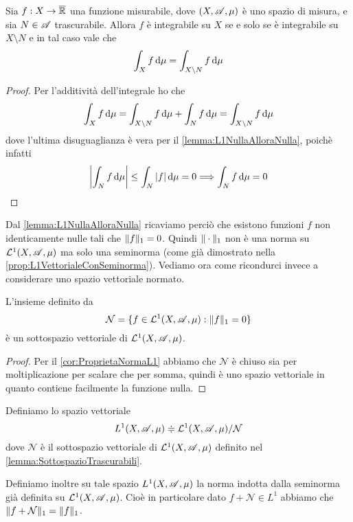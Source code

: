 \begin{corollary}\label{cor:IntegraleAMenoDiTrascurabili}
	Sia $f:X\to\overline{\mathbb R}$ una funzione misurabile, dove $(X,\mathscr A,\mu)$ è uno spazio di misura, e sia $N\in\mathscr A$ trascurabile. Allora $f$ è integrabile su $X$ se e solo se è integrabile su $X\setminus N$ e in tal caso vale che
	\begin{equation*}
		\int_X f\,\mathrm d\mu=\int_{X\setminus N}f\,\mathrm d\mu
	\end{equation*}
\end{corollary}
\begin{proof}
	Per l'additività dell'integrale ho che
	\begin{equation*}
		\int_X f\,\mathrm d\mu=\int_{X\setminus N} f \,\mathrm d\mu+\int_N f\,\mathrm d\mu=\int_{X\setminus N}f\,\mathrm d\mu
	\end{equation*}
	dove l'ultima disuguaglianza è vera per il \cref{lemma:L1NullaAlloraNulla}, poichè infatti
	\begin{equation*}
		\left|\int_N f\,\mathrm d\mu\right|\le \int_N |f|\,\mathrm d\mu=0 \Longrightarrow \int_N f\,\mathrm d\mu=0
	\end{equation*}

\end{proof}


Dal \cref{lemma:L1NullaAlloraNulla} ricaviamo perciò che esistono funzioni $f$ non identicamente nulle tali che $\Vert f\Vert_1=0$. Quindi $\Vert \cdot\Vert_1$ non è una norma su $\mathcal L^1(X,\mathscr A,\mu)$ ma solo una seminorma (come già dimostrato nella \cref{prop:L1VettorialeConSeminorma}). Vediamo ora come ricondurci invece a considerare uno spazio vettoriale normato.

\begin{lemma}\label{lemma:SottospazioTrascurabili}
	L'insieme definito da
	\begin{equation*}
		\mathcal{N}=\{ f\in\mathcal L^1(X,\mathscr A,\mu) : \Vert f\Vert_1=0\}
	\end{equation*}
	è un sottospazio vettoriale di $\mathcal L^1(X,\mathscr A,\mu)$.
\end{lemma}
\begin{proof}
	Per il \cref{cor:ProprietaNormaL1} abbiamo che $\mathcal{N}$ è chiuso sia per moltiplicazione per scalare che per somma, quindi è uno spazio vettoriale in quanto contiene facilmente la funzione nulla.
\end{proof}

\begin{definition}
	Definiamo lo spazio vettoriale
	\begin{equation*}
		L^1(X,\mathscr A,\mu)\doteqdot \mathcal L^1(X,\mathscr A,\mu)/\mathcal{N}
	\end{equation*}
	dove $\mathcal{N}$ è il sottospazio vettoriale di $\mathcal L^1(X,\mathscr A,\mu)$ definito nel \cref{lemma:SottospazioTrascurabili}.
	
	Definiamo inoltre su tale spazio $L^1(X,\mathscr A,\mu)$ la norma indotta dalla seminorma già definita su $\mathcal L^1(X,\mathscr A,\mu)$. Cioè in particolare dato $f+\mathcal{N}\in L^1$ abbiamo che $\Vert f+\mathcal{N}\Vert_1=\Vert f\Vert_1$.
\end{definition}

